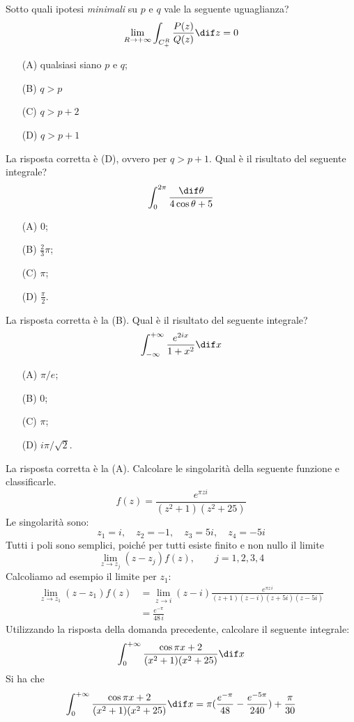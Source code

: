 Sotto quali ipotesi \emph{minimali} su $p$ e $q$ vale la seguente uguaglianza? \[
    \lim_{R\to+\infty}\int_{C^{R}_{+}}\frac{P(z)}{Q(z)}\dif z = 0
\]
\begin{itemize}
    \item[(A)] qualsiasi siano $ p $ e $ q $; 
    \item[(B)] $ q>p $
    \item[(C)] $ q>p+2 $
    \item[(D)] $ q> p+1 $
\end{itemize}
    La risposta corretta è (D), ovvero per $ q>p+1 $.
Qual è il risultato del seguente integrale?
\[\int_0^{2\pi} \frac{\dif\theta}{4\cos\theta+5}\]
\begin{itemize}
    \item[(A)] $ 0 $;
    \item[(B)] $\frac{2}{3} \pi $;
    \item[(C)] $\pi$; 
    \item[(D)] $\frac{\pi}{2}$.
\end{itemize}
    La risposta corretta è la (B).
    Qual è il risultato del seguente integrale?
    \[
        \int_{-\infty}^{+\infty}\frac{e^{2ix}}{1+x^2}\dif x
    \]
    \begin{itemize}
        \item[(A)] $\pi/e$;
        \item[(B)] $0$;
        \item[(C)] $\pi$; 
        \item[(D)] $i\pi/\sqrt{2}$.
    \end{itemize}
    La risposta corretta è la (A). 
    Calcolare le singolarità della seguente funzione e classificarle. \[
        f(z)=\frac{e^{\pi zi}}{(z^2+1)(z^2+25)}
    \]
    Le singolarità sono: 
   \[
       z_1 = i,\quad z_2=-1,\quad z_3=5i,\quad z_4=-5i
   \]Tutti i poli sono semplici, poiché per tutti esiste finito e non nullo il limite \[
    \lim_{z\to z_j} (z-z_j)f(z),\qquad j=1,2,3,4
   \]Calcoliamo ad esempio il limite per $ z_1 $: \begin{align*}
        \lim_{z\to z_1} (z-z_1)f(z) &=\lim_{z\to i} (z-i)\frac{e^{\pi z\,i}}{(z+1)(z-i)(z+5i)(z-5i)}\\ 
        &= \frac{e^{-\pi}}{48\,i}
   \end{align*}
    Utilizzando la risposta della domanda precedente, calcolare il seguente integrale: \[
        \int_0^{+\infty}\frac{\cos{\pi x}+2}{(x^2+1)(x^2+25)}\dif x
    \]
    Si ha che \[
        \int_0^{+\infty}\frac{\cos{\pi x}+2}{(x^2+1)(x^2+25)}\dif x=\pi (\frac{e^{-\pi}}{48}-\frac{e^{-5\pi}}{240})+\frac{\pi}{30}
    \]
